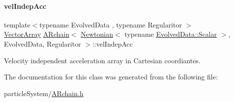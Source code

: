 \mbox{\label{class_a_rchain_3_01_newtonian_3_01typename_01_evolved_data_1_1_scalar_01_4_00_01_evolved_data_00_01_regularitor_01_4_af0862cdda12b7ba2ba5d5d098d008398}} 
\paragraph{\texorpdfstring{vel\+Indep\+Acc}{velIndepAcc}}
{\footnotesize\ttfamily template$<$typename Evolved\+Data , typename Regularitor $>$ \\
\mbox{\hyperlink{class_a_rchain_3_01_newtonian_3_01typename_01_evolved_data_1_1_scalar_01_4_00_01_evolved_data_00_01_regularitor_01_4_a1ff7d2e64f488df9edae2ad796945bbd}{Vector\+Array}} \mbox{\hyperlink{class_a_rchain}{A\+Rchain}}$<$ \mbox{\hyperlink{class_newtonian}{Newtonian}}$<$ typename \mbox{\hyperlink{class_a_rchain_a707e42a79e4744424a34c9007e84ee07}{Evolved\+Data\+::\+Scalar}} $>$, Evolved\+Data, Regularitor $>$\+::vel\+Indep\+Acc\hspace{0.3cm}{\ttfamily [private]}}



Velocity independent acceleration array in Cartesian coordiantes. 



The documentation for this class was generated from the following file\+:\begin{DoxyCompactItemize}
\item 
particle\+System/\mbox{\hyperlink{_a_rchain_8h}{A\+Rchain.\+h}}\end{DoxyCompactItemize}
